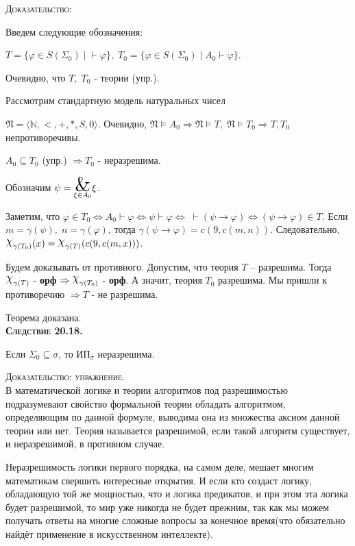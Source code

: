 \documentclass[18pt, a4paper]{extarticle}
\newcommand{\sled}[1]{\textbf{\textsc{Следствие #1}}}
\newcommand{\vp}{\varphi}
\newcommand{\vd}{\vdash}
\newcommand{\vD}{\vDash}
\newcommand{\mR}{\mathfrak{N}}
\newcommand{\dok}{\textsc{Доказательство:}}
\newcommand{\dokup}{\textsc{Доказательство: упражнение.}}
\begin{document}
\dok

Введем следующие обозначения:

$T=\{\vp\in S(\Sigma_0)\;|\;\vd\vp\},\;T_0=\{\vp\in S(\Sigma_0)\;|\;A_0\vd\vp\}$. 

Очевидно, что $T,\;T_0$ - теории (упр.).

Рассмотрим стандартную модель натуральных чисел 

$\mR=\langle \mathbb N,<,+,*,S,0\rangle$. Очевидно, $\mR\vD A_0\Rightarrow\mR\vD T,\;\mR\vD T_0\Rightarrow T,T_0$ непротиворечивы.

$A_0\subseteq T_0$ (упр.) $\Rightarrow T_0$ - неразрешима.

Обозначим $\psi=\underset{\xi\in A_0}{\scalebox{2.1}{\&}}\xi$.

Заметим, что $\vp\in T_0\Leftrightarrow A_0\vd\vp\Leftrightarrow\psi\vd\vp\Leftrightarrow\;\vd(\psi\to\vp)\Leftrightarrow(\psi\to\vp)\in T$. Если $m=\gamma(\psi),\;n=\gamma(\vp)$, тогда $\gamma(\psi\to\vp)=c(9,c(m,n))$. Следовательно, $\raisebox{.5ex}{\scalebox{1.2}{$\chi$}}_{\gamma(T_0)}(x)=\raisebox{.5ex}{\scalebox{1.2}{$\chi$}}_{\gamma(T)}(c(9,c(m,x)))$.

Будем доказывать от противного. Допустим, что теория $T$ – разрешима. Тогда $\raisebox{.5ex}{\scalebox{1.2}{$\chi$}}_{\gamma(T)}$ - \textbf{орф} $\Rightarrow\raisebox{.5ex}{\scalebox{1.2}{$\chi$}}_{\gamma(T_0)}$ - \textbf{орф}. А значит, теория $T_0$ разрешима. Мы пришли к противоречию $\Rightarrow T$ - не разрешима.

Теорема доказана.\\

\sled{20.18.} 

Если $\Sigma_0\subseteq\sigma$, то $\text{ИП}_\sigma$ неразрешима.

\dokup\\

В математической логике и теории алгоритмов под разрешимостью подразумевают свойство формальной теории обладать алгоритмом, определяющим по данной формуле, выводима она из множества аксиом данной теории или нет. Теория называется разрешимой, если такой алгоритм существует, и неразрешимой, в противном случае. 

Неразрешимость логики первого порядка, на самом деле, мешает многим математикам свершить интересные открытия. И если кто создаст логику, обладающую той же мощностью, что и логика предикатов, и при этом эта логика будет разрешимой, то мир уже никогда не будет прежним, так как мы можем получать ответы на многие сложные вопросы за конечное время(что обязательно найдёт применение в искусственном интеллекте).\\\newpage
\end{document}
